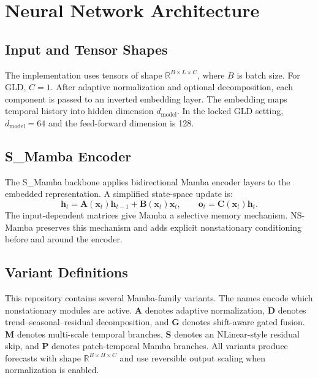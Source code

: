 \section{Neural Network Architecture}

\subsection{Input and Tensor Shapes}

The implementation uses tensors of shape $\mathbb{R}^{B \times L \times C}$, where $B$ is batch size.
For GLD, $C=1$.
After adaptive normalization and optional decomposition, each component is passed to an inverted embedding layer.
The embedding maps temporal history into hidden dimension $d_{\mathrm{model}}$.
In the locked GLD setting, $d_{\mathrm{model}}=64$ and the feed-forward dimension is 128.

\subsection{S\_Mamba Encoder}

The S\_Mamba backbone applies bidirectional Mamba encoder layers to the embedded representation.
A simplified state-space update is:
\begin{equation}
    \mathbf{h}_t
    =
    \mathbf{A}(\mathbf{x}_t)\mathbf{h}_{t-1}
    +
    \mathbf{B}(\mathbf{x}_t)\mathbf{x}_t,
    \qquad
    \mathbf{o}_t
    =
    \mathbf{C}(\mathbf{x}_t)\mathbf{h}_t.
\end{equation}
The input-dependent matrices give Mamba a selective memory mechanism.
NS-Mamba preserves this mechanism and adds explicit nonstationary conditioning before and around the encoder.

\subsection{Variant Definitions}

This repository contains several Mamba-family variants.
The names encode which nonstationary modules are active.
\textbf{A} denotes adaptive normalization, \textbf{D} denotes trend--seasonal--residual decomposition, and \textbf{G} denotes shift-aware gated fusion.
\textbf{M} denotes multi-scale temporal branches, \textbf{S} denotes an NLinear-style residual skip, and \textbf{P} denotes patch-temporal Mamba branches.
All variants produce forecasts with shape $\mathbb{R}^{B \times H \times C}$ and use reversible output scaling when normalization is enabled.

